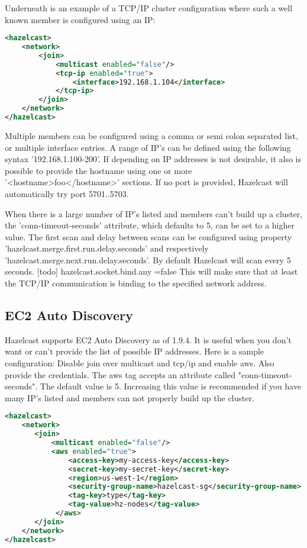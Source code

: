 Underneath is an example of a TCP/IP cluster configuration where such a well known member is configured using an IP:
\begin{lstlisting}[language=xml]
<hazelcast>
    <network>
        <join>
            <multicast enabled="false"/>
            <tcp-ip enabled="true">
                <interface>192.168.1.104</interface> 
            </tcp-ip>
        </join>
    </network>
</hazelcast>
\end{lstlisting}
Multiple members can be configured using a comma or semi colon separated list, or multiple interface entries. A range of IP's can be defined using the following syntax '192.168.1.100-200'. If depending on IP addresses is not desirable, it also is possible to provide the hostname using one or more '<hostname>foo</hostname>' sections. If no port is provided, Hazelcast will automatically try port 5701..5703. 

When there is a large number of IP's listed and members can't build up a cluster, the 'conn-timeout-seconds' attribute, which defaults to 5, can be set to a higher value. The first scan and delay between scans can be configured using property 'hazelcast.merge.first.run.delay.seconds' and respectively 'hazelcast.merge.next.run.delay.seconds'. By default Hazelcast will scan every 5 seconds.
[todo]
hazelcast.socket.bind.any =false
This will make sure that at least the TCP/IP communication is binding to the specified network address.

\subsection{EC2 Auto Discovery}

Hazelcast supports EC2 Auto Discovery as of 1.9.4. It is useful when you don't want or can't provide the list of possible IP addresses. Here is a sample configuration: Disable join over multicast and tcp/ip and enable aws. Also provide the credentials. The aws tag accepts an attribute called "conn-timeout-seconds". The default value is 5. Increasing this value is recommended if you have many IP's listed and members can not properly build up the cluster.

\begin{lstlisting}[language=xml]
<hazelcast>
    <network>
       <join>
           <multicast enabled="false"/>
           <aws enabled="true">
               <access-key>my-access-key</access-key>
               <secret-key>my-secret-key</secret-key>
               <region>us-west-1</region>                              <!-- optional, default is us-east-1 -->
               <security-group-name>hazelcast-sg</security-group-name> <!-- optional -->
               <tag-key>type</tag-key>                                  <!-- optional -->
               <tag-value>hz-nodes</tag-value>                          <!-- optional -->
            </aws>
       </join>
    </network>
</hazelcast>
\end{lstlisting}



